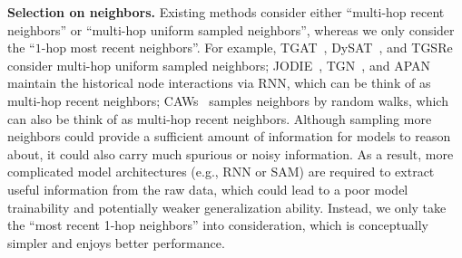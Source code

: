 \noindent\textbf{Selection on neighbors.}
Existing methods consider either ``multi-hop recent neighbors'' or ``multi-hop uniform sampled neighbors'', whereas we only consider the ``$1$-hop most recent neighbors''. For example, TGAT~\cite{xu2020inductive}, DySAT~\cite{sankar2020dysat}, and TGSRe~\cite{fan2021continuous} consider multi-hop uniform sampled neighbors; JODIE~\cite{kumar2019predicting}, TGN~\cite{tgn_icml_grl2020}, and APAN~\cite{wang2021apan} maintain the historical node interactions via RNN, which can be think of as multi-hop recent neighbors; CAWs~\cite{wang2020inductive} samples neighbors by random walks, which can also be think of as multi-hop recent neighbors.
Although sampling more neighbors could provide a sufficient amount of information for models to reason about, it could also carry much spurious or noisy information. As a result, more complicated model architectures (e.g., RNN or SAM) are required to extract useful information from the raw data, which could lead to a poor model trainability and potentially weaker generalization ability.  
Instead, we only take the ``most recent 1-hop neighbors'' into consideration, which is conceptually simpler and enjoys better performance. 





